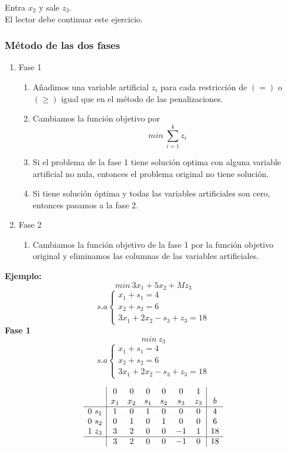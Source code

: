 \documentclass[11pt,fleqn]{book} %
\begin{document}
Entra $x_2$ y sale $z_3$. \\
El lector debe continuar este ejercicio.

\subsubsection{Método de las dos fases}
\begin{enumerate}
\item Fase 1
  \begin{enumerate}
  \item Añadimos una variable artificial $z_i$ para cada restricción de $(=)$ o $(\geq)$ igual que en el método de las penalizaciones.
  \item Cambiamos la función objetivo por
	$$ min ~ \sum_{i=1}^{k}z_i $$
  \item Si el problema de la fase 1 tiene solución optima con alguna variable artificial no nula, entonces el problema original no tiene solución.
  \item Si tiene solución óptima y todas las variables artificiales son cero, entonces pasamos a la fase 2.
  \end{enumerate}
\item Fase 2
  \begin{enumerate}
  \item Cambiamos la función objetivo de la fase 1 por la función objetivo original y eliminamos las columnas de las variables artificiales.
  \end{enumerate}
\end{enumerate}

\textbf{Ejemplo: }
$$ min ~ 3x_1+5x_2+M z_3 $$
$$ s.a \left\{
\begin{array}{c}
  x_1+s_1=4 \\
  x_2 + s_2 = 6 \\
  3x_1+2x_2-s_3+z_3=18
\end{array}
\right.
$$
\textbf{Fase 1}
$$ min ~ z_3 $$
$$ s.a \left\{
\begin{array}{c}
  x_1+s_1=4 \\
  x_2 + s_2 = 6 \\
  3x_1+2x_2-s_3+z_3=18
\end{array}
\right.
$$

$$
\begin{array}{c|cccccc|c}
  & 0 & 0 & 0 & 0 & 0 & 1 & \\
  & x_1 & x_2 & s_1 & s_2 & s_3 & z_3 & b \\ \hline
  0 ~ s_1 & 1 & 0 & 1 & 0 & 0 & 0 & 4 \\
  0 ~ s_2 & 0 & 1 & 0 & 1 & 0 & 0 & 6 \\
  1 ~ z_3 & 3 & 2 & 0 & 0 & -1 & 1 & 18 \\ \hline
  & 3 & 2 & 0 & 0 & -1 & 0 & 18
\end{array}
$$
\end{document}
